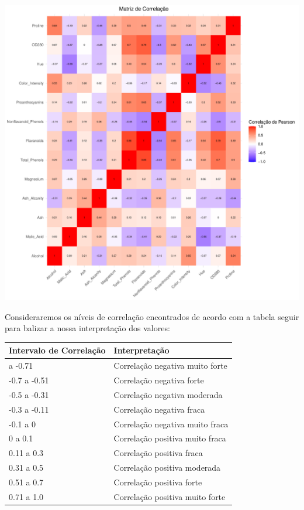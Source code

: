 \documentclass[
  letterpaper,
  DIV=11,
  numbers=noendperiod]{scrartcl}
\begin{document}
\includegraphics{wines_analysis_files/figure-pdf/unnamed-chunk-7-1.pdf}

\newpage{}

Consideraremos os níveis de correlação encontrados de acordo com a
tabela seguir para balizar a nossa interpretação dos valores:

\begin{longtable}[]{@{}ll@{}}
\toprule\noalign{}
Intervalo de Correlação & Interpretação \\
\midrule\noalign{}
\endhead
\bottomrule\noalign{}
\endlastfoot
-1.0 a -0.71 & Correlação negativa muito forte \\
-0.7 a -0.51 & Correlação negativa forte \\
-0.5 a -0.31 & Correlação negativa moderada \\
-0.3 a -0.11 & Correlação negativa fraca \\
-0.1 a 0 & Correlação negativa muito fraca \\
0 a 0.1 & Correlação positiva muito fraca \\
0.11 a 0.3 & Correlação positiva fraca \\
0.31 a 0.5 & Correlação positiva moderada \\
0.51 a 0.7 & Correlação positiva forte \\
0.71 a 1.0 & Correlação positiva muito forte \\
\end{longtable}
\end{document}
